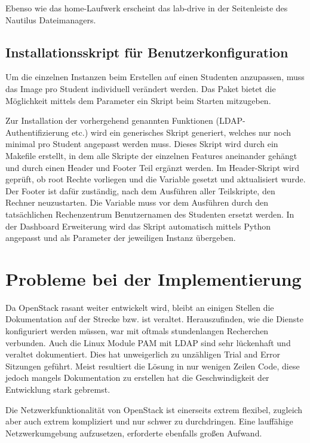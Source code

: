Ebenso wie das home-Laufwerk erscheint das lab-drive in der Seitenleiste des Nautilus Dateimanagers.

\subsection{Installationsskript  für Benutzerkonfiguration}

Um die einzelnen Instanzen beim Erstellen auf einen Studenten anzupassen, muss das Image pro Student individuell verändert werden. 
Das  Paket bietet die Möglichkeit mittels dem Parameter  ein Skript beim Starten mitzugeben. 

Zur Installation der vorhergehend genannten Funktionen (LDAP-Authentifizierung etc.) wird ein generisches Skript generiert, welches nur noch minimal pro Student angepasst werden muss.
Dieses Skript  wird durch ein Makefile erstellt, in dem alle  Skripte der einzelnen Features aneinander gehängt und durch einen Header und Footer Teil ergänzt werden.
Im Header-Skript wird geprüft, ob root Rechte vorliegen und die  Variable gesetzt und  aktualisiert wurde. 
Der Footer ist dafür zuständig, nach dem Ausführen aller Teilskripte, den Rechner neuzustarten.
Die  Variable muss vor dem Ausführen durch den tatsächlichen Rechenzentrum Benutzernamen des Studenten ersetzt werden.
In der Dashboard Erweiterung wird das Skript automatisch mittels Python angepasst und 
als  Parameter der jeweiligen Instanz übergeben.

\section{Probleme bei der Implementierung}

Da OpenStack rasant weiter entwickelt wird, bleibt an einigen Stellen die Dokumentation auf der Strecke bzw. ist veraltet. 
Herauszufinden, wie die Dienste konfiguriert werden müssen, war mit oftmals stundenlangen Recherchen verbunden.
Auch die Linux Module PAM mit LDAP sind sehr lückenhaft und veraltet dokumentiert.
Dies hat unweigerlich zu unzähligen Trial and Error Sitzungen geführt.
Meist resultiert die Lösung in nur wenigen Zeilen Code, diese jedoch mangels Dokumentation zu erstellen hat die Geschwindigkeit der Entwicklung stark gebremst.

Die Netzwerkfunktionalität von OpenStack ist einerseits extrem flexibel, zugleich aber auch extrem kompliziert und nur schwer zu durchdringen.
Eine lauffähige Netzwerkumgebung aufzusetzen, erforderte ebenfalls großen Aufwand.

